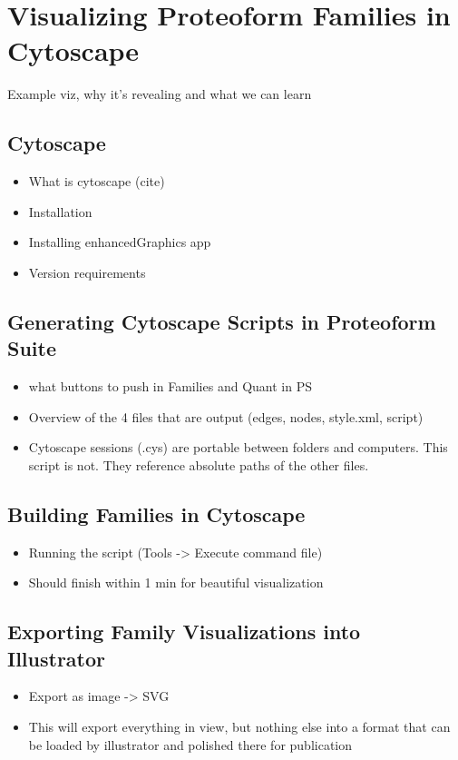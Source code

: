 
\section{Visualizing Proteoform Families in Cytoscape}
Example viz, why it's revealing and what we can learn

\subsection{Cytoscape}
\begin{itemize}
	\item What is cytoscape (cite)
	\item Installation
	\item Installing enhancedGraphics app
	\item Version requirements
\end{itemize}

\subsection{Generating Cytoscape Scripts in Proteoform Suite}
\begin{itemize}
	\item what buttons to push in Families and Quant in PS
	\item Overview of the 4 files that are output (edges, nodes, style.xml, script)
	\item Cytoscape sessions (.cys) are portable between folders and computers. This script is not. They reference absolute paths of the other files.
\end{itemize}

\subsection{Building Families in Cytoscape}
\begin{itemize}
	\item Running the script (Tools -> Execute command file)
	\item Should finish within 1 min for beautiful visualization
\end{itemize}

\subsection{Exporting Family Visualizations into Illustrator}
\begin{itemize}
	\item Export as image -> SVG
	\item This will export everything in view, but nothing else into a format that can be loaded by illustrator and polished there for publication
\end{itemize}

